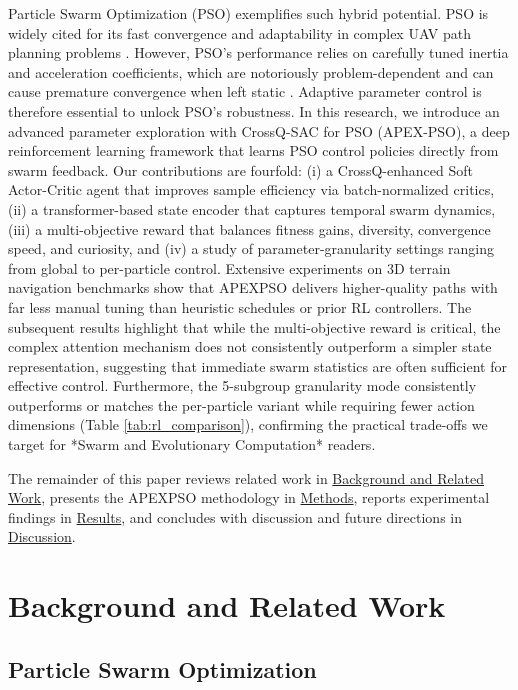 \documentclass[fleqn,10pt]{wlscirep}
\begin{document}
Particle Swarm Optimization (PSO) \cite{kennedy1995pso} exemplifies such hybrid potential.
PSO is widely cited for its fast convergence and adaptability in complex UAV path planning problems \cite{Cheng2024UAVPSO}.
However, PSO's performance relies on carefully tuned inertia and acceleration coefficients, which are notoriously problem-dependent and can cause premature convergence when left static \cite{yang2015lhnpso}.
Adaptive parameter control is therefore essential to unlock PSO's robustness.
In this research, we introduce an advanced parameter exploration with CrossQ-SAC for PSO (APEX-PSO), a deep reinforcement learning framework that learns PSO control policies directly from swarm feedback.
Our contributions are fourfold: (i) a CrossQ-enhanced Soft Actor-Critic agent that improves sample efficiency via batch-normalized critics, (ii) a transformer-based state encoder that captures temporal swarm dynamics, (iii) a multi-objective reward that balances fitness gains, diversity, convergence speed, and curiosity, and (iv) a study of parameter-granularity settings ranging from global to per-particle control.
Extensive experiments on 3D terrain navigation benchmarks show that APEXPSO delivers higher-quality paths with far less manual tuning than heuristic schedules or prior RL controllers.
The subsequent results highlight that while the multi-objective reward is critical, the complex attention mechanism does not consistently outperform a simpler state representation, suggesting that immediate swarm statistics are often sufficient for effective control. Furthermore, the 5-subgroup granularity mode consistently outperforms or matches the per-particle variant while requiring fewer action dimensions (Table \ref{tab:rl_comparison}), confirming the practical trade-offs we target for *Swarm and Evolutionary Computation* readers.

The remainder of this paper reviews related work in \hyperref[sec:background]{Background and Related Work}, presents the APEXPSO methodology in \hyperref[sec:methods]{Methods}, reports experimental findings in \hyperref[sec:results]{Results}, and concludes with discussion and future directions in \hyperref[sec:discussion]{Discussion}.
\section*{Background and Related Work}
\label{sec:background}

\subsection*{Particle Swarm Optimization}
\end{document}

